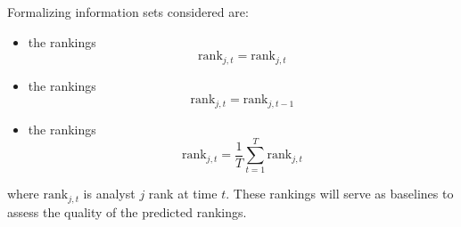\documentclass[a4paper,12pt,openright,notitlepage]{report}\usepackage[]{graphicx}\usepackage[]{color}
\begin{document}
Formalizing information sets considered are:
\begin{itemize}
	\item  the \tr{} rankings%
	\begin{equation}
		\label{rank:true}
		\mathrm{rank}_{j,t}=\mathrm{rank}_{j,t}
	\end{equation}
	
	\item  the \naive{} rankings %
	\begin{equation}
		\label{rank:naive}
		\mathrm{rank}_{j,t}=\mathrm{rank}_{j,t-1}
	\end{equation}
	
	\item  the   rankings%
	\begin{equation}
		\label{rank:default}
		\mathrm{rank}_{j,t} = \frac{1}{T} \sum_{t=1}^{T} \mathrm{rank}_{j,t}
	\end{equation}
	
\end{itemize}
where $\mathrm{rank}_{j,t}$ is analyst $j$  rank at time $t$. These rankings will serve as  baselines to assess the quality of the predicted rankings.
\end{document}
